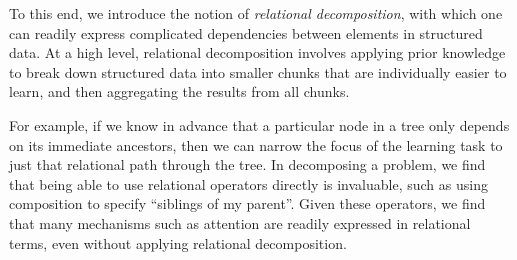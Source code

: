 

To this end, we introduce the notion of \textit{relational decomposition}, with 
which one can readily express complicated dependencies between elements in 
structured data. At a high level, relational decomposition involves applying 
prior knowledge to break down structured data into smaller chunks that are 
individually easier to learn, and then aggregating the results from all chunks. 

For example, if we know in advance that a particular node in a tree only depends 
on its immediate ancestors, then we can narrow the focus of the learning task to 
just that relational path through the tree. In decomposing a problem, we find 
that being able to use relational operators directly is invaluable, such as 
using composition to specify ``siblings of my parent''. Given these operators, 
we find that many mechanisms such as attention are readily expressed in 
relational terms, even without applying relational decomposition.




%





